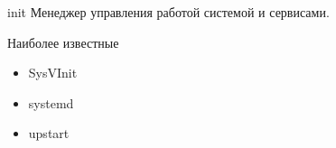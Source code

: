 \begin{frame}{init}
	Менеджер управления работой системой и сервисами.
	
	\bigskip


	\bigskip

	\begin{block}{Наиболее известные}
		\begin{itemize}
			\item SysVInit
			\item systemd
			\item upstart
		\end{itemize}
	\end{block}
\end{frame}
